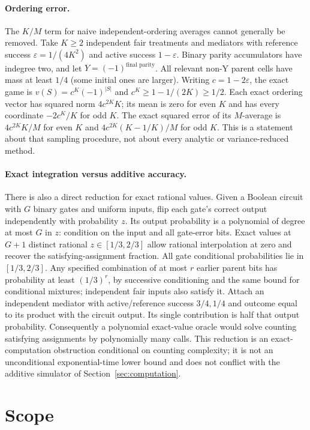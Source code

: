 \documentclass[11pt,a4paper]{article}
\numberwithin{equation}{section}
\theoremstyle{definition}
\begin{document}
\paragraph{Ordering error.}
The $K/M$ term for naive independent-ordering averages cannot generally
be removed. Take $K\ge2$ independent fair treatments and mediators with
reference success $\varepsilon=1/(4K^2)$ and active success
$1-\varepsilon$. Binary parity accumulators have indegree two, and let
$Y=(-1)^{\text{final parity}}$. All relevant non-Y parent cells have
mass at least $1/4$ (some initial ones are larger). Writing
$c=1-2\varepsilon$, the exact game is $v(S)=c^K(-1)^{|S|}$ and
$c^K\ge1-1/(2K)\ge1/2$. Each exact ordering vector has squared norm
$4c^{2K}K$; its mean is zero for even $K$ and has every coordinate
$-2c^K/K$ for odd $K$. The exact squared error of its $M$-average is
$4c^{2K}K/M$ for even $K$ and
$4c^{2K}(K-1/K)/M$ for odd $K$. This is a statement about that
sampling procedure, not about every analytic or variance-reduced method.

\paragraph{Exact integration versus additive accuracy.}
There is also a direct reduction for exact rational values. Given a
Boolean circuit with $G$ binary gates and uniform inputs, flip each gate's
correct output independently with probability $z$. Its output probability
is a polynomial of degree at most $G$ in $z$: condition on the input and
all gate-error bits. Exact values at $G+1$ distinct rational
$z\in[1/3,2/3]$ allow rational interpolation at zero and recover the
satisfying-assignment fraction. All gate conditional probabilities lie
in $[1/3,2/3]$. Any specified combination of at most $r$ earlier parent
bits has probability at least $(1/3)^r$, by successive conditioning
and the same bound for conditional mixtures; independent fair inputs
also satisfy it. Attach an independent mediator with active/reference
success $3/4,1/4$ and outcome equal to its product with the circuit
output. Its single contribution is half that output probability.
Consequently a polynomial exact-value oracle would solve counting
satisfying assignments by polynomially many calls. This reduction is
an exact-computation obstruction conditional on counting complexity;
it is not an unconditional exponential-time lower bound and does not
conflict with the additive simulator of Section~\ref{sec:computation}.

\section{Scope}\label{sec:verification}
\end{document}
